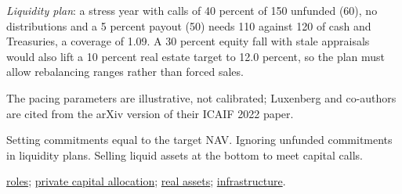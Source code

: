 \begin{qfmethod}
\emph{Liquidity plan}: a stress year with calls of 40 percent of 150 unfunded (60), no distributions and a 5 percent payout (50) needs 110 against 120 of cash and Treasuries, a coverage of 1.09. A 30 percent equity fall with stale appraisals would also lift a 10 percent real estate target to 12.0 percent, so the plan must allow rebalancing ranges rather than forced sales.

 The pacing parameters are illustrative, not calibrated; Luxenberg and co-authors are cited from the arXiv version of their ICAIF 2022 paper.

 Setting commitments equal to the target NAV. Ignoring unfunded commitments in liquidity plans. Selling liquid assets at the bottom to meet capital calls.

 \hyperref[def:alternatives-roles-opportunity-set]{roles}; \hyperref[meth:private-capital-allocation]{private capital allocation}; \hyperref[meth:real-assets-allocation]{real assets}; \hyperref[meth:infrastructure-allocation]{infrastructure}.

\end{qfmethod}
